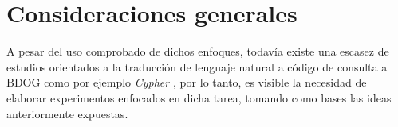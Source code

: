 \section{Consideraciones generales} \label{llm_approach_finetunig}

A pesar del uso comprobado de dichos enfoques, todavía existe una escasez de estudios orientados a la traducción de lenguaje natural a código de consulta a BDOG como por ejemplo \textit{Cypher} \cite{gpt4graphpaper2023}, por lo tanto, es visible la necesidad de elaborar experimentos enfocados en dicha tarea, tomando como bases las ideas anteriormente expuestas.


